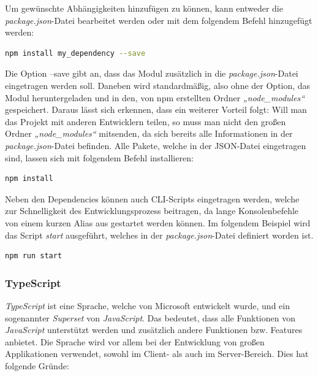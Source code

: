 Um gewünschte Abhängigkeiten hinzufügen zu können, kann entweder die \textit{package.json}-Datei bearbeitet werden oder mit dem folgendem Befehl hinzugefügt werden:

\begin{lstlisting}[language=bash, caption=Hinzufügen einer Abhängigkeit mit der Option --save]
npm install my_dependency --save
\end{lstlisting}

Die Option --save gibt an, dass das Modul zusätzlich in die \textit{package.json}-Datei eingetragen werden soll. Daneben wird standardmäßig, also ohne der Option, das Modul heruntergeladen und in den, von npm erstellten Ordner \textit{„node\_modules“} gespeichert. Daraus lässt sich erkennen, dass ein weiterer Vorteil folgt: Will man das Projekt mit anderen Entwicklern teilen, so muss man nicht den großen Ordner \textit{„node\_modules“} mitsenden, da sich bereits alle Informationen in der \textit{package.json}-Datei befinden.
Alle Pakete, welche in der JSON-Datei eingetragen sind, lassen sich mit folgendem Befehl installieren:

\begin{lstlisting}[language=bash, caption=Installieren aller Abhängigkeiten von package.json]
npm install
\end{lstlisting}

Neben den Dependencies können auch CLI-Scripts eingetragen werden, welche zur Schnelligkeit des Entwicklungsprozess beitragen, da lange Konsolenbefehle von einem kurzen Alias aus gestartet werden können.
Im folgendem Beispiel wird das Script \textit{start} ausgeführt, welches in der \textit{package.json}-Datei definiert worden ist.

\begin{lstlisting}[language=bash, caption=Starten des definierten Scripts start]
npm run start
\end{lstlisting}

\clearpage
\subsubsection{TypeScript}
\label{sec:typescript}
\textit{TypeScript} ist eine Sprache, welche von Microsoft entwickelt wurde, und ein sogenannter \textit{Superset} von \textit{JavaScript}. Das bedeutet, dass alle Funktionen von \textit{JavaScript} unterstützt werden und zusätzlich andere Funktionen bzw. Features anbietet. Die Sprache wird vor allem bei der Entwicklung von großen Applikationen verwendet, sowohl im Client- als auch im Server-Bereich. Dies hat folgende Gründe:

